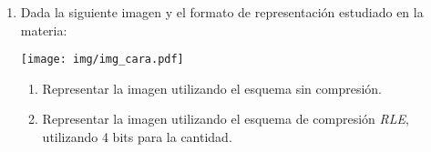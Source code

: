 \documentclass[12pt]{article}
\begin{document}
\begin{enumerate}
    \item Dada la siguiente imagen y el formato de representación estudiado en
        la materia:

    \texttt{[image: img/img\_cara.pdf]}

    \begin{enumerate}

        \item Representar la imagen utilizando el esquema sin compresión.

        \item Representar la imagen utilizando el esquema de compresión
            \emph{RLE}, utilizando 4 bits para la cantidad.

    \end{enumerate}

\end{enumerate}
\end{document}
